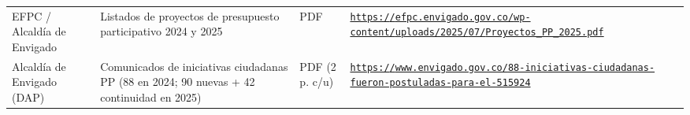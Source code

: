 \documentclass[11pt,letterpaper]{article}
\begin{document}
{\begin{xltabular}{\linewidth}{L{2.8cm}YL{1.6cm}Y}
EFPC /\allowbreak{} Alcaldía de Envigado & Listados de proyectos de presupuesto participativo 2024 y 2025 & PDF & \texttt{\footnotesize \href{https://efpc.envigado.gov.co/wp-content/uploads/2025/07/Proyectos_PP_2025.pdf}{https:/\allowbreak{}}\allowbreak{}\href{https://efpc.envigado.gov.co/wp-content/uploads/2025/07/Proyectos_PP_2025.pdf}{/\allowbreak{}}\allowbreak{}\href{https://efpc.envigado.gov.co/wp-content/uploads/2025/07/Proyectos_PP_2025.pdf}{efpc.\allowbreak{}envigado.\allowbreak{}gov.\allowbreak{}co/\allowbreak{}}\allowbreak{}\href{https://efpc.envigado.gov.co/wp-content/uploads/2025/07/Proyectos_PP_2025.pdf}{wp-\allowbreak{}content/\allowbreak{}}\allowbreak{}\href{https://efpc.envigado.gov.co/wp-content/uploads/2025/07/Proyectos_PP_2025.pdf}{uploads/\allowbreak{}}\allowbreak{}\href{https://efpc.envigado.gov.co/wp-content/uploads/2025/07/Proyectos_PP_2025.pdf}{2025/\allowbreak{}}\allowbreak{}\href{https://efpc.envigado.gov.co/wp-content/uploads/2025/07/Proyectos_PP_2025.pdf}{07/\allowbreak{}}\allowbreak{}\href{https://efpc.envigado.gov.co/wp-content/uploads/2025/07/Proyectos_PP_2025.pdf}{Proyectos\_\allowbreak{}PP\_\allowbreak{}2025.\allowbreak{}pdf}} \\
Alcaldía de Envigado (DAP) & Comunicados de iniciativas ciudadanas PP (88 en 2024; 90 nuevas + 42 continuidad en 2025) & PDF (2 p.\allowbreak{} c/\allowbreak{}u) & \texttt{\footnotesize \href{https://www.envigado.gov.co/88-iniciativas-ciudadanas-fueron-postuladas-para-el-515924}{https:/\allowbreak{}}\allowbreak{}\href{https://www.envigado.gov.co/88-iniciativas-ciudadanas-fueron-postuladas-para-el-515924}{/\allowbreak{}}\allowbreak{}\href{https://www.envigado.gov.co/88-iniciativas-ciudadanas-fueron-postuladas-para-el-515924}{www.\allowbreak{}envigado.\allowbreak{}gov.\allowbreak{}co/\allowbreak{}}\allowbreak{}\href{https://www.envigado.gov.co/88-iniciativas-ciudadanas-fueron-postuladas-para-el-515924}{88-\allowbreak{}iniciativas-\allowbreak{}ciudadanas-\allowbreak{}fueron-\allowbreak{}postuladas-\allowbreak{}para-\allowbreak{}el-\allowbreak{}515924}} \\

\end{xltabular}}
\end{document}
